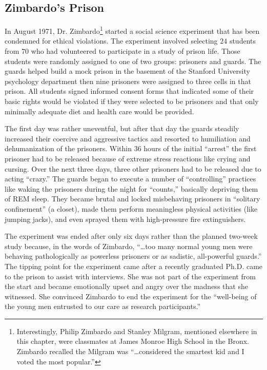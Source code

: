 \subsection{Zimbardo's Prison}

In August 1971, Dr. Zimbardo\footnote{Interestingly, Philip Zimbardo and Stanley Milgram, mentioned elsewhere in this chapter, were classmates at James Monroe High School in the Bronx. Zimbardo recalled the Milgram was ``\ldots considered the smartest kid and I voted the most popular.''\cite{zimbardo2000reflections}} started a social science experiment that has been condemned for ethical violations\cite{zimbardo2000reflections}. The experiment involved selecting $ 24 $ students from $ 70 $ who had volunteered to participate in a study of prison life. Those students were randomly assigned to one of two groups: prisoners and guards. The guards helped build a mock prison in the basement of the Stanford University psychology department then nine prisoners were assigned to three cells in that prison. All students signed informed consent forms that indicated some of their basic rights would be violated if they were selected to be prisoners and that only minimally adequate diet and health care would be provided. 

The first day was rather uneventful, but after that day the guards steadily increased their coercive and aggressive tactics and resorted to humiliation and dehumanization of the prisoners. Within $ 36 $ hours of the initial ``arrest'' the first prisoner had to be released because of extreme stress reactions like crying and cursing. Over the next three days, three other prisoners had to be released due to acting ``crazy.'' The guards began to execute a number of ``controlling'' practices like waking the prisoners during the night for ``counts,'' basically depriving them of REM sleep. They became brutal and locked misbehaving prisoners in ``solitary confinement'' (a closet), made them perform meaningless physical activities (like jumping jacks), and even sprayed them with high-pressure fire extinguishers.

The experiment was ended after only six days rather than the planned two-week study because, in the words of Zimbardo, ``\ldots too many normal young men were behaving pathologically as powerless prisoners or as sadistic, all-powerful guards.'' The tipping point for the experiment came after a recently graduated Ph.D. came to the prison to assist with interviews. She was not part of the experiment from the start and became emotionally upset and angry over the madness that she witnessed. She convinced Zimbardo to end the experiment for the ``well-being of the young men entrusted to our care as research participants.'' 

